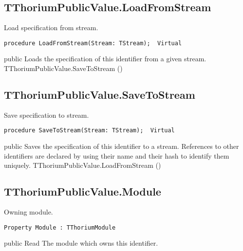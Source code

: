 \subsection{TThoriumPublicValue.LoadFromStream}
\label{thoriumcorepkg:thorium:tthoriumpublicvalue:loadfromstream}
\begin{FPCList}
\Synopsis
Load specification from stream.\Declaration 

\begin{verbatim}
procedure LoadFromStream(Stream: TStream);  Virtual
\end{verbatim}
\Visibility
public
\Description
Loads the specification of this identifier from a given stream.\SeeAlso
TThoriumPublicValue.SaveToStream (\pageref{thoriumcorepkg:thorium:tthoriumpublicvalue:savetostream})\end{FPCList}
\subsection{TThoriumPublicValue.SaveToStream}
\label{thoriumcorepkg:thorium:tthoriumpublicvalue:savetostream}
\begin{FPCList}
\Synopsis
Save specification to stream.\Declaration 

\begin{verbatim}
procedure SaveToStream(Stream: TStream);  Virtual
\end{verbatim}
\Visibility
public
\Description
Saves the specification of this identifier to a stream. References to other identifiers are declared by using their name and their hash to identify them uniquely.\SeeAlso
TThoriumPublicValue.LoadFromStream (\pageref{thoriumcorepkg:thorium:tthoriumpublicvalue:loadfromstream})\end{FPCList}
\subsection{TThoriumPublicValue.Module}
\label{thoriumcorepkg:thorium:tthoriumpublicvalue:module}
\begin{FPCList}
\Synopsis
Owning module.\Declaration 

\begin{verbatim}
Property Module : TThoriumModule
\end{verbatim}
\Visibility
public
\Access
Read
\Description
The module which owns this identifier.\end{FPCList}

